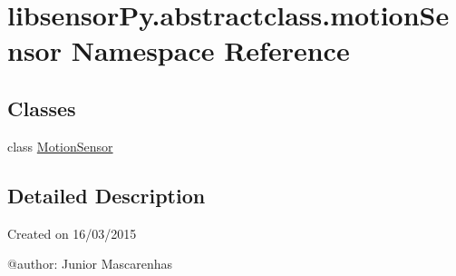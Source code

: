 \hypertarget{namespacelibsensorPy_1_1abstractclass_1_1motionSensor}{}\section{libsensor\+Py.\+abstractclass.\+motion\+Sensor Namespace Reference}
\label{namespacelibsensorPy_1_1abstractclass_1_1motionSensor}
\subsection*{Classes}
\begin{DoxyCompactItemize}
\item 
class \hyperlink{classlibsensorPy_1_1abstractclass_1_1motionSensor_1_1MotionSensor}{Motion\+Sensor}
\end{DoxyCompactItemize}


\subsection{Detailed Description}
\begin{DoxyVerb}Created on 16/03/2015

@author: Junior Mascarenhas
\end{DoxyVerb}
 
